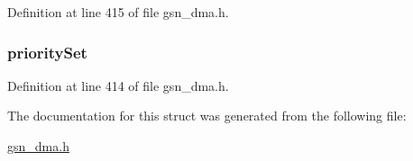 Definition at line 415 of file gsn\_\-dma.h.

\hypertarget{a00053_ae0862381c59e1675e1d630f6a1d28864}{
\subsubsection[{prioritySet}]{ {\bf prioritySet}}}
\label{a00053_ae0862381c59e1675e1d630f6a1d28864}


Definition at line 414 of file gsn\_\-dma.h.



The documentation for this struct was generated from the following file:\begin{DoxyCompactItemize}
\item 
\hyperlink{a00484}{gsn\_\-dma.h}\end{DoxyCompactItemize}
